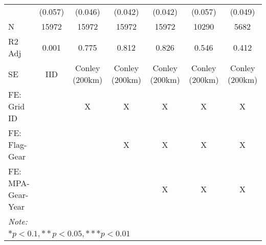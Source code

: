 \begin{table}
\begin{tabular}[t]{lcccccc}
\hspace{1em} & (0.057) & (0.046) & (0.042) & (0.042) & (0.057) & (0.049)\\
\hspace{1em}N & 15972 & 15972 & 15972 & 15972 & 10290 & 5682\\
\hspace{1em}R2 Adj & 0.001 & 0.775 & 0.812 & 0.826 & 0.546 & 0.412\\
\hspace{1em}SE & IID & Conley (200km) & Conley (200km) & Conley (200km) & Conley (200km) & Conley (200km)\\
\midrule
FE: Grid ID &  & X & X & X & X & X\\
FE: Flag-Gear &  &  & X & X & X & X\\
FE: MPA-Gear-Year &  &  &  & X & X & X\\
\midrule
\bottomrule
\multicolumn{7}{l}{\rule{0pt}{1em}\textit{Note: }}\\
\multicolumn{7}{l}{\rule{0pt}{1em}$* p < 0.1, ** p < 0.05, *** p < 0.01$}\\
\end{tabular}
\end{table}